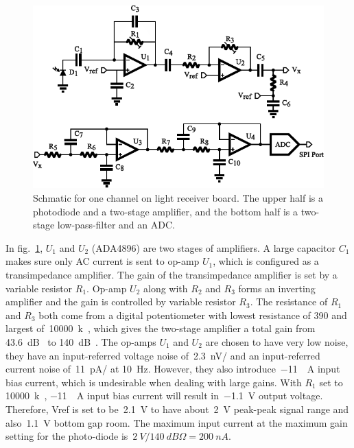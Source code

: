 \begin{figure}[h]
\centerline{\includegraphics[scale=0.8]{4-ANC_Sys/ReceiverSch.pdf}}
\caption{Schmatic for one channel on light receiver board.  The upper half is a photodiode and a two-stage amplifier, and the bottom half is a two-stage low-pass-filter and an ADC.}
\label{fig_ReceiverSch}
\end{figure}

In fig.~\ref{fig_ReceiverSch}, $U_1$ and $U_2$ (ADA4896) are two stages of amplifiers.  A large capacitor $C_1$ makes sure only AC current is sent to op-amp $U_1$, which is configured as a transimpedance amplifier.  The gain of the transimpedance amplifier is set by a variable resistor $R_1$.  Op-amp $U_2$ along with $R_2$ and $R_3$ forms an inverting amplifier and the gain is controlled by variable resistor $R_3$.  The resistance of $R_1$ and $R_3$ both come from a digital potentiometer with  lowest resistance of \qty{390}{\Omega} and largest of~\qty{10000}{k\Omega}, which gives the two-stage amplifier a total gain from \qty{43.6}{dB\Omega} to \qty{140}{dB\Omega}.  The op-amps $U_1$ and $U_2$ are chosen to have very low noise, they have an input-referred voltage noise of~\qty{2.3}{nV/\sqrthz} and an input-referred current noise of~\qty{11}{pA/\sqrthz} at \qty{10}{\Hz}.  However, they also introduce~\qty{-11}{\mu A} input bias current, which is undesirable when dealing with large gains.  With $R_1$ set to \qty{10000}{k\Omega}, \qty{-11}{\mu A} input bias current will result in~\qty{-1.1}{V} output voltage. Therefore, Vref is set to be~\qty{2.1}{V} to have about~\qty{2}{V} peak-peak signal range and also~\qty{1.1}{V} bottom gap room.  The maximum input current at the maximum gain setting for the photo-diode is~$\qty{2}{V}/\qty{140}{dB\Omega}=\qty{200}{nA}$.

